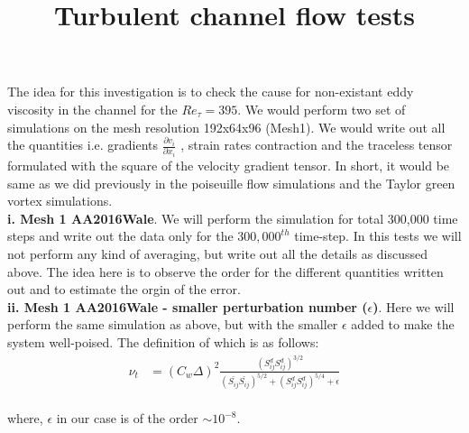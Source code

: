 \documentclass[a4paper]{article}
\def\D{\partial}
\def\sij{\bar{S_{ij}}}
\begin{document}
\title{Turbulent channel flow tests}

\maketitle



The idea for this investigation is to check the cause for non-existant eddy viscosity in the channel for the ${Re_{\tau}} = 395$.
We would perform two set of simulations on the mesh resolution 192x64x96 (Mesh1). We would write out all the quantities i.e. gradients $\frac{\D v_i}{\D x_i}$ , strain rates contraction and the traceless tensor formulated with the square of the velocity gradient tensor. In short, it would be same as we did previously in the poiseuille flow simulations and the Taylor green vortex simulations. \\

{\bf i. Mesh 1 AA2016Wale}. We will perform the simulation for total 300,000 time steps and write out the data only for the $300,000^{th}$ time-step. In this tests we will not perform any kind of averaging, but write out all the details as discussed above. The idea here is to observe the order for the different quantities written out and to estimate the orgin of the error.\\

{\bf ii. Mesh 1 AA2016Wale -  smaller perturbation number ($\epsilon$)}. Here we will perform the same simulation as above, but with the smaller $\epsilon$ added to make the system well-poised.
The definition of which is as follows:\\
%
\begin{equation}
\label{eddy-viscosity}
\begin{split}
{\nu_t} &= \left({C_w}{\Delta}\right)^{2}
\frac{\left({S_{ij}^{d}}{S_{ij}^{d}}\right)^{3/2}}{\left(\sij \sij\right)^{5/2} + {\left({S_{ij}^{d}}{S_{ij}^{d}}\right)^{5/4}} + \epsilon}
\end{split}
\end{equation}
%
\\
where, $\epsilon$ in our case is of the order $\sim 10^{-8}$.\\
\end{document}
